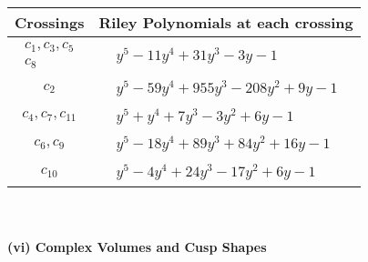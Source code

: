 \documentclass[1p]{elsarticle_modified}
\theoremstyle{definition}
\begin{document}
\begin{tabular}{m{50pt}|m{274pt}}
Crossings & \hspace{64pt}Riley Polynomials at each crossing \\
\hline $$\begin{aligned}c_{1},c_{3},c_{5}\\c_{8}\end{aligned}$$&$\begin{aligned}
&y^5-11 y^4+31 y^3-3 y-1
\end{aligned}$\\
\hline $$\begin{aligned}c_{2}\end{aligned}$$&$\begin{aligned}
&y^5-59 y^4+955 y^3-208 y^2+9 y-1
\end{aligned}$\\
\hline $$\begin{aligned}c_{4},c_{7},c_{11}\end{aligned}$$&$\begin{aligned}
&y^5+y^4+7 y^3-3 y^2+6 y-1
\end{aligned}$\\
\hline $$\begin{aligned}c_{6},c_{9}\end{aligned}$$&$\begin{aligned}
&y^5-18 y^4+89 y^3+84 y^2+16 y-1
\end{aligned}$\\
\hline $$\begin{aligned}c_{10}\end{aligned}$$&$\begin{aligned}
&y^5-4 y^4+24 y^3-17 y^2+6 y-1
\end{aligned}$\\
\hline
\end{tabular}\\~\\
\newpage\flushleft \textbf{(vi) Complex Volumes and Cusp Shapes}
\end{document}

